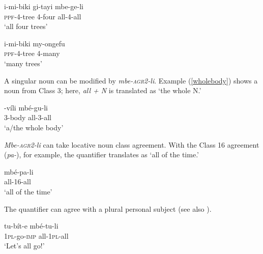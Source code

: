 \documentclass[letterpaper, 12pt]{article}
\begin{document}
\begin{exe}

\ex\begin{xlist}

\ex \gll i-mi-biki gi-tayi mbe-ge-li\\ 
\textsc{ppf}-4-tree 4-four all-4-all\\
`all four trees' \\ \label{alltrees}

\ex \gll i-mi-biki my-ongefu\\
\textsc{ppf}-4-tree 4-many \\
`many trees' \label{manytrees}

\end{xlist}

\end{exe}



A singular noun can be modified by \textit{mbe-\textsc{agr2}-li}. Example (\ref{wholebody}) shows a noun from Class 3; here, \textit{all + N} is translated as `the whole N.'

\begin{exe} 

\ex \gll {}-v\'ili mb\'e-gu-li  \label{wholebody} \\   
3-body all-3-all \\
`a/the whole body' \\  

\end{exe}


\textit{Mbe-\textsc{agr2}-li} can take locative noun class agreement. With the Class 16 agreement (\textit{pa-}), for example, the quantifier translates as `all of the time.'

\begin{exe}
\ex \gll mb\'e-pa-li \\
all-16-all \\
`all of the time' \\
\end{exe}


The quantifier can agree with a plural personal subject (see also ).

\begin{exe}   

\ex \gll tu-b\'it-e mb\'e-tu-li \label{subjectagreement} \\
\textsc{1pl}-go-\textsc{imp} all-\textsc{1pl}-all \\  
`Let's all go!'

\end{exe}
\end{document}
